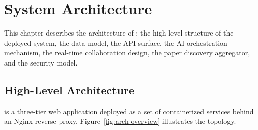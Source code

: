 \chapter{System Architecture}
\label{ch:architecture}

This chapter describes the architecture of \sh{}: the high-level structure of the deployed system, the data model, the API surface, the AI orchestration mechanism, the real-time collaboration design, the paper discovery aggregator, and the security model.

\section{High-Level Architecture}
\label{sec:arch-overview}

\sh{} is a three-tier web application deployed as a set of containerized services behind an Nginx reverse proxy. Figure~\ref{fig:arch-overview} illustrates the topology.


